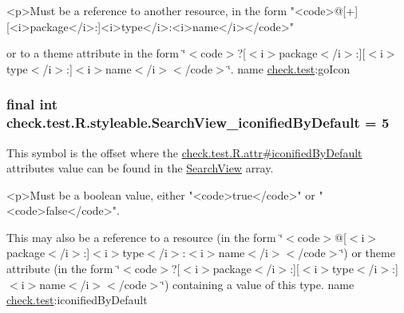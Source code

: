 \begin{DoxyVerb}      <p>Must be a reference to another resource, in the form "<code>@[+][<i>package</i>:]<i>type</i>:<i>name</i></code>"
\end{DoxyVerb}
 or to a theme attribute in the form \char`\"{}$<$code$>$?\mbox{[}$<$i$>$package$<$/i$>$\+:\mbox{]}\mbox{[}$<$i$>$type$<$/i$>$\+:\mbox{]}$<$i$>$name$<$/i$>$$<$/code$>$\char`\"{}.  name \hyperlink{namespacecheck_1_1test}{check.\+test}\+:go\+Icon \hypertarget{classcheck_1_1test_1_1_r_1_1styleable_aa8cd4a6d1145a57929dc88b7db75616a}{}
\subsubsection[{Search\+View\+\_\+iconified\+By\+Default}]{\setlength{\rightskip}{0pt plus 5cm}final int check.\+test.\+R.\+styleable.\+Search\+View\+\_\+iconified\+By\+Default = 5\hspace{0.3cm}{\ttfamily [static]}}\label{classcheck_1_1test_1_1_r_1_1styleable_aa8cd4a6d1145a57929dc88b7db75616a}
This symbol is the offset where the \hyperlink{classcheck_1_1test_1_1_r_1_1attr_aeb43240baae0ba0739bca74fbbd9e646}{check.\+test.\+R.\+attr\#iconified\+By\+Default} attribute\textquotesingle{}s value can be found in the \hyperlink{classcheck_1_1test_1_1_r_1_1styleable_af133609668e9a4263b21387e9a7574f8}{Search\+View} array.

\begin{DoxyVerb}      <p>Must be a boolean value, either "<code>true</code>" or "<code>false</code>".
\end{DoxyVerb}
 

This may also be a reference to a resource (in the form \char`\"{}$<$code$>$@\mbox{[}$<$i$>$package$<$/i$>$\+:\mbox{]}$<$i$>$type$<$/i$>$\+:$<$i$>$name$<$/i$>$$<$/code$>$\char`\"{}) or theme attribute (in the form \char`\"{}$<$code$>$?\mbox{[}$<$i$>$package$<$/i$>$\+:\mbox{]}\mbox{[}$<$i$>$type$<$/i$>$\+:\mbox{]}$<$i$>$name$<$/i$>$$<$/code$>$\char`\"{}) containing a value of this type.  name \hyperlink{namespacecheck_1_1test}{check.\+test}\+:iconified\+By\+Default \hypertarget{classcheck_1_1test_1_1_r_1_1styleable_a43de74d589f89c8acfb186f9078f5192}{}
